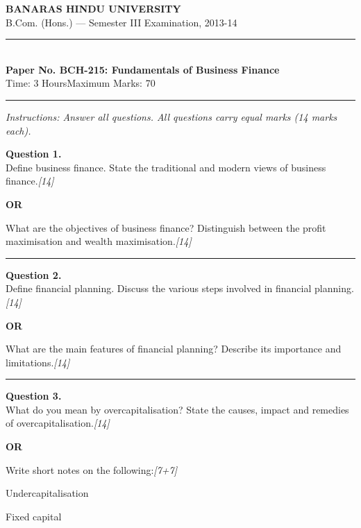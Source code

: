 \documentclass[11pt,a4paper]{article}
\newcommand{\pts}[1]{\hfill   \textit{[#1]}}
\begin{document}
\begin{center}
  {\large\bfseries BANARAS HINDU UNIVERSITY}\\[2pt]
  {\normalsize B.Com. (Hons.) --- Semester III Examination, 2013-14}\\[6pt]
  \rule{0.8\linewidth}{0.5pt}\\[6pt]
  {\large\bfseries Paper No. BCH-215: Fundamentals of Business Finance}\\[4pt]
  {\normalsize Time: 3 Hours\hfill Maximum Marks: 70}
\end{center}

\rule{\linewidth}{0.4pt}

\smallskip



\noindent   \textit{Instructions: Answer all questions. All questions carry equal marks (14 marks each).}

\bigskip




\noindent   \textbf{Question 1.} \\
Define business finance. State the traditional and modern views of business finance.\pts{14}

\centerline{   \textbf{OR}}

What are the objectives of business finance? Distinguish between the profit maximisation and wealth maximisation.\pts{14}

\medskip\rule{\linewidth}{0.2pt}




\noindent   \textbf{Question 2.} \\
Define financial planning. Discuss the various steps involved in financial planning.\pts{14}

\centerline{   \textbf{OR}}

What are the main features of financial planning? Describe its importance and limitations.\pts{14}

\medskip\rule{\linewidth}{0.2pt}




\noindent   \textbf{Question 3.} \\
What do you mean by overcapitalisation? State the causes, impact and remedies of overcapitalisation.\pts{14}

\centerline{   \textbf{OR}}

Write short notes on the following:\pts{7+7}

\begin{parts}
  \item Undercapitalisation
  \item Fixed capital
\end{parts}
\end{document}
